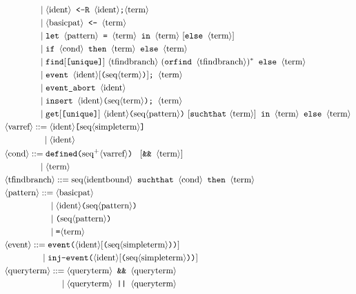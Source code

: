 \begin{figure}
\begin{align*}
&\pht \Resbvt\texttt{;}\nonterm{term}\\
&\pht \nonterm{basicpat} \texttt{ <- } \nonterm{term}\\
&\pht \texttt{let } \nonterm{pattern} \texttt{ = }\nonterm{term}\texttt{ in }\nonterm{term}\ [\texttt{else }\nonterm{term}]\\
&\pht \texttt{if }\nonterm{cond}\texttt{ then } \nonterm{term} \texttt{ else }\nonterm{term}\\
&\pht \texttt{find}[\texttt{[unique]}]\ \nonterm{tfindbranch}\ (\texttt{orfind }\nonterm{tfindbranch})^*\texttt{ else }\nonterm{term}\\
&\pht \texttt{event }\nonterm{ident}[\texttt{(}\seq{term}\texttt{)}]\texttt{; }\nonterm{term}\\
&\pht \texttt{event\string_abort }\nonterm{ident}\\
&\pht \texttt{insert }\nonterm{ident}\texttt{(}\seq{term}\texttt{)}\texttt{; }\nonterm{term}\\
&\pht \texttt{get}[\texttt{[unique]}]\ \nonterm{ident}\texttt{(}\seq{pattern}\texttt{)}\ [\texttt{suchthat}\ \nonterm{term}]\texttt{ in }\nonterm{term}\texttt{ else }\nonterm{term}\\
&\nonterm{varref} ::= \nonterm{ident}\texttt{[}\seq{simpleterm}\texttt{]}\\
&\phantom{\nonterm{varref} =}\mid \nonterm{ident}\\
&\nonterm{cond} ::= \texttt{defined(} \neseq{varref} \texttt{) }\ [\texttt{\&\& }\nonterm{term}]\\
&\phantom{\nonterm{cond} = }\mid \nonterm{term}\\
&\nonterm{tfindbranch} ::= \seq{identbound} \texttt{ suchthat } \nonterm{cond} \texttt{ then }\nonterm{term}\\
&\nonterm{pattern} ::= \nonterm{basicpat}\\
&\phpat \nonterm{ident}\texttt{(} \seq{pattern}\texttt{)}\\
&\phpat \texttt{(} \seq{pattern}\texttt{)}\\
&\phpat \texttt{=} \nonterm{term}\\
&\nonterm{event} ::= \texttt{event(}\nonterm{ident}[\texttt{(}\seq{simpleterm}\texttt{))}]\\
&\phantom{\nonterm{event} =}\mid \texttt{inj-event(}\nonterm{ident}[\texttt{(}\seq{simpleterm}\texttt{))}]\\
&\nonterm{queryterm} ::= \nonterm{queryterm}\texttt{ \&\& }\nonterm{queryterm}\\
&\phqt \nonterm{queryterm}\texttt{ || }\nonterm{queryterm}\\

\end{align*}
\end{figure}

